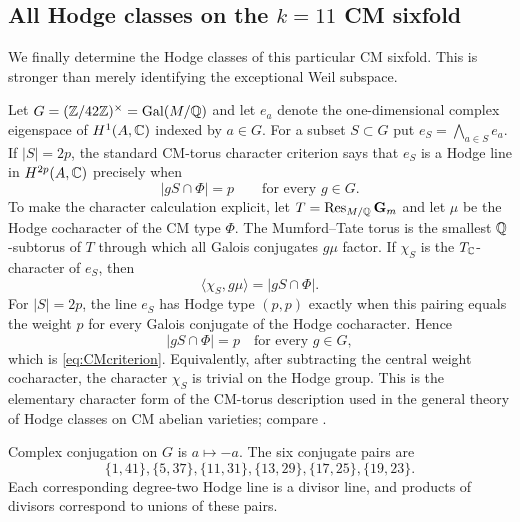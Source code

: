 \subsection{All Hodge classes on the $k=11$ CM sixfold}\label{sec:fullhodge}
We finally determine the Hodge classes of this particular CM sixfold.  This is stronger than merely identifying the exceptional Weil subspace.

Let $G=(\mathbb Z/42\mathbb Z)^\times=\operatorname{Gal}(M/\mathbb Q)$ and let $e_a$ denote the one-dimensional complex eigenspace of $H^1(A,\mathbb C)$ indexed by $a\in G$.  For a subset $S\subset G$ put $e_S=\bigwedge_{a\in S}e_a$.  If $|S|=2p$, the standard CM-torus character criterion says that $e_S$ is a Hodge line in $H^{2p}(A,\mathbb C)$ precisely when
\begin{equation}\label{eq:CMcriterion}
 |gS\cap\Phi|=p\qquad\text{for every }g\in G.
\end{equation}
To make the character calculation explicit, let $T=\operatorname{Res}_{M/\mathbb Q}\mathbf G_m$ and let $\mu$ be the Hodge cocharacter of the CM type $\Phi$.  The Mumford--Tate torus is the smallest $\mathbb Q$-subtorus of $T$ through which all Galois conjugates $g\mu$ factor.  If $\chi_S$ is the $T_\mathbb C$-character of $e_S$, then
\[
 \langle\chi_S,g\mu\rangle=|gS\cap\Phi|.
\]
For $|S|=2p$, the line $e_S$ has Hodge type $(p,p)$ exactly when this pairing equals the weight $p$ for every Galois conjugate of the Hodge cocharacter.  Hence
\[
 |gS\cap\Phi|=p\quad\text{for every }g\in G,
\]
which is \eqref{eq:CMcriterion}.  Equivalently, after subtracting the central weight cocharacter, the character $\chi_S$ is trivial on the Hodge group.  This is the elementary character form of the CM-torus description used in the general theory of Hodge classes on CM abelian varieties; compare \cite{MilneHodge2020}.

Complex conjugation on $G$ is $a\mapsto-a$.  The six conjugate pairs are
\[
 \{1,41\},\{5,37\},\{11,31\},\{13,29\},\{17,25\},\{19,23\}.
\]
Each corresponding degree-two Hodge line is a divisor line, and products of divisors correspond to unions of these pairs.

